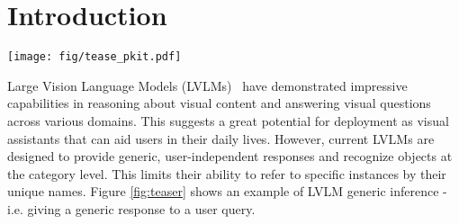 \section{Introduction}
\vspace{-0.2cm}
\label{sec:intro}
\begin{figure*}[h]
    \centering
    \texttt{[image: fig/tease\_pkit.pdf]}
    \vspace{-0.5cm}
    \caption{\textbf{Illustration of the personalization task and our  \ours.}
    A reference image is introduced to the \VLM with information and possible context. The \VLM should later be able to answer questions about the introduced object using only the name of the object in the query. Our approach, \ours, extracts patch-level features from the reference image and stores them in a memory module,  $\mathcal{M}$. During personalized inference, our retrieval module, $\mathcal{R}$, queries  $\mathcal{M}$ to detect the object. \ours then informs the \VLM via a visual prompt, providing the name and possible context.}
    \vspace{-0.5cm}
    \label{fig:teaser}
\end{figure*}

Large Vision Language Models (LVLMs)~\cite{liu2024visual,liu2024improved,chen2024internvl,zhu2023minigpt,li2023blip,agrawal2024pixtral12b,wang2024qwen2} have demonstrated impressive capabilities in reasoning about visual content and answering visual questions across various domains. This suggests a great potential for deployment as visual assistants that can aid users in their daily lives. However, current LVLMs are designed to provide generic, user-independent responses and recognize objects at the category level. This limits their ability to refer to specific instances by their unique names. Figure \ref{fig:teaser} shows an example of LVLM generic inference - i.e. giving a generic response to a user query.


